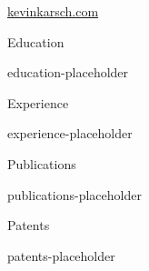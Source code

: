 


\geometry{top=1in, bottom=1in, left=1in, right=1in}

\hypersetup{colorlinks=true, allcolors=secondaryColor}



\centerline{}
\centerline{\href{https://kevinkarsch.com}{kevinkarsch.com}}

\begin{cvSection}{Education}

{{education-placeholder}}

\end{cvSection}


\begin{cvSection}{Experience}

{{experience-placeholder}}

\end{cvSection}


\begin{cvSection}{Publications}

{{publications-placeholder}}

\end{cvSection}


\begin{cvSection}{Patents}

{{patents-placeholder}}

\end{cvSection}


